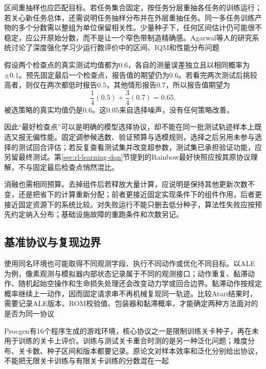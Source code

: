 区间重抽样也应匹配目标。若任务集合固定，按任务分层重抽各任务的训练运行；若关心新任务总体，还需说明任务抽样分布并在外层重抽任务。同一多任务训练产物的多个分数需以整组为单位保留相关性。少量种子下，任何区间估计仍可能很不稳定，应公开原始分数，而不是让一个窄色带制造精确感。Agarwal等人的研究系统讨论了深度强化学习少运行数评价中的区间、IQM和性能分布问题

\begin{example}[挑最好检查点造成的偏差]
  \label{ex:rl-learning-checkpoint-selection}
  假设两个检查点的真实测试均值都为$0.6$，各自的测量误差独立且以相同概率为$\pm0.1$。预先固定最后一个检查点，报告值的期望仍为$0.6$。若看完两次测试后挑较高者，则仅在两次都低时报告$0.5$，其他情形报告$0.7$，所以报告值期望为
  \[
    \frac14(0.5)+\frac34(0.7)=0.65.
  \]
  被选策略的真实均值仍是$0.6$。这$0.05$来自选择噪声，没有任何策略改善。
\end{example}

因此“最好检查点”可以是明确的模型选择协议，却不能在同一批测试轨迹样本上既选又报无偏性能。固定调参候选数、验证预算与选模规则，选择之后另用未参与选择的测试回合评估；若反复查看测试集并改变超参数，测试集已承担验证功能，应另留最终测试。第\ref{sec:rl-learning-dqn}节提到的Rainbow最好快照应按其原协议理解，不与固定最后检查点悄然混比。

消融也需相同预算。去掉组件后若释放大量计算，应说明是保持其他更新次数不变，还是把省下的计算重新分配；前者更接近固定实现条件下的组件作用，后者更接近固定资源下的系统比较。对失败运行不能只删去低分种子，算法性失败应按预先约定纳入分布；基础设施故障的重跑条件和次数另记。

\subsection{基准协议与复现边界}
\label{sec:rl-learning-benchmark-protocol}

使用同名环境也可能取得不同观测字段、执行不同动作或优化不同目标。以ALE为例，像素观测与模拟器内部状态记录属于不同的观测接口；动作重复、黏滞动作、随机起始空操作和生命损失处理还会改变动力学或回合边界。黏滞动作按规定概率继续上一动作，因而固定请求串不再机械复现同一轨迹。比较Atari结果时，需要记录ALE版本、ROM校验值、包装器和黏滞概率，才能确定两种方法面对的是否为同一协议

Procgen有16个程序生成的游戏环境，核心协议之一是限制训练关卡种子，再在未用于训练的关卡上评价。训练与测试关卡重合时测的是另一种泛化问题；难度分布、关卡数、种子区间和版本都要记录。原论文对样本效率和泛化分别给出协议，不能把无限关卡训练与有限关卡训练的分数混在一起

